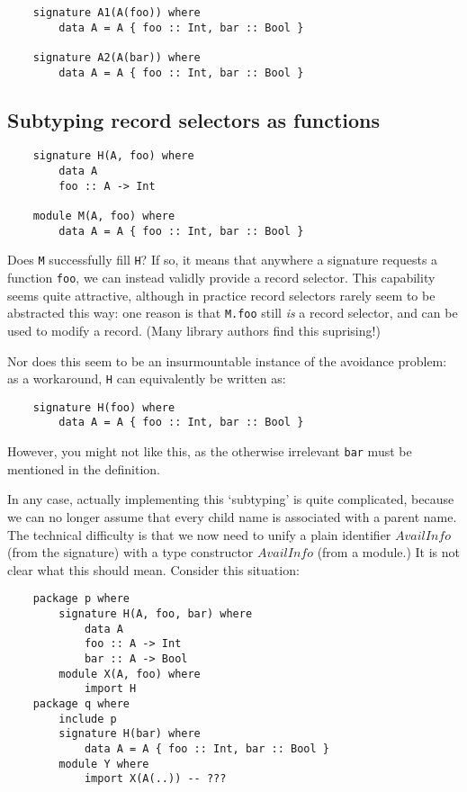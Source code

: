 \documentclass{article}
\newcommand{\I}[1]{\ensuremath{\mathit{#1}}}
\begin{document}
\begin{verbatim}
    signature A1(A(foo)) where
        data A = A { foo :: Int, bar :: Bool }

    signature A2(A(bar)) where
        data A = A { foo :: Int, bar :: Bool }
\end{verbatim}

\subsection{Subtyping record selectors as functions}

\begin{verbatim}
    signature H(A, foo) where
        data A
        foo :: A -> Int

    module M(A, foo) where
        data A = A { foo :: Int, bar :: Bool }
\end{verbatim}
%
Does \verb|M| successfully fill \verb|H|?  If so, it means that anywhere
a signature requests a function \verb|foo|, we can instead validly
provide a record selector.  This capability seems quite attractive,
although in practice record selectors rarely seem to be abstracted this
way: one reason is that \verb|M.foo| still \emph{is} a record selector,
and can be used to modify a record.  (Many library authors find this
suprising!)

Nor does this seem to be an insurmountable instance of the avoidance
problem:
as a workaround, \verb|H| can equivalently be written as:

\begin{verbatim}
    signature H(foo) where
        data A = A { foo :: Int, bar :: Bool }
\end{verbatim}
%
However, you might not like this, as the otherwise irrelevant \verb|bar| must be mentioned
in the definition.

In any case, actually implementing this `subtyping' is quite complicated, because we can no
longer assume that every child name is associated with a parent name.
The technical difficulty is that we now need to unify a plain identifier
\I{AvailInfo} (from the signature) with a type constructor \I{AvailInfo}
(from a module.)  It is not clear what this should mean.
Consider this situation:

\begin{verbatim}
    package p where
        signature H(A, foo, bar) where
            data A
            foo :: A -> Int
            bar :: A -> Bool
        module X(A, foo) where
            import H
    package q where
        include p
        signature H(bar) where
            data A = A { foo :: Int, bar :: Bool }
        module Y where
            import X(A(..)) -- ???
\end{verbatim}
\end{document}
